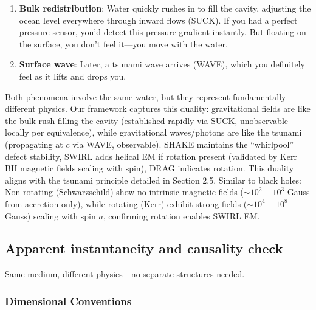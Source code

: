 \begin{enumerate}
\item \textbf{Bulk redistribution}: Water quickly rushes in to fill the cavity, adjusting the ocean level everywhere through inward flows (SUCK). If you had a perfect pressure sensor, you'd detect this pressure gradient instantly. But floating on the surface, you don't feel it---you move with the water.
\item \textbf{Surface wave}: Later, a tsunami wave arrives (WAVE), which you definitely feel as it lifts and drops you.
\end{enumerate}

Both phenomena involve the same water, but they represent fundamentally different physics. Our framework captures this duality: gravitational fields are like the bulk rush filling the cavity (established rapidly via SUCK, unobservable locally per equivalence), while gravitational waves/photons are like the tsunami (propagating at $c$ via WAVE, observable). SHAKE maintains the ``whirlpool'' defect stability, SWIRL adds helical EM if rotation present (validated by Kerr BH magnetic fields scaling with spin), DRAG indicates rotation. This duality aligns with the tsunami principle detailed in Section 2.5. Similar to black holes: Non-rotating (Schwarzschild) show no intrinsic magnetic fields ($\sim 10^2 - 10^3$ Gauss from accretion only), while rotating (Kerr) exhibit strong fields ($\sim 10^4 - 10^8$ Gauss) scaling with spin $a$, confirming rotation enables SWIRL EM.

\subsection{Apparent instantaneity and causality check}\label{sec:tsunami-causality}

Same medium, different physics---no separate structures needed.

\medskip
{}

\subsubsection{Dimensional Conventions}
